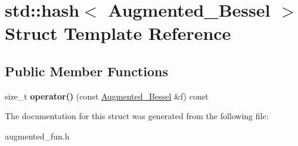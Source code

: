 \hypertarget{structstd_1_1hash_3_01Augmented__Bessel_01_4}{}\section{std\+:\+:hash$<$ Augmented\+\_\+\+Bessel $>$ Struct Template Reference}
\label{structstd_1_1hash_3_01Augmented__Bessel_01_4}
\subsection*{Public Member Functions}
\begin{DoxyCompactItemize}
\item 
\mbox{\label{structstd_1_1hash_3_01Augmented__Bessel_01_4_a81662182d4729c33627b6dbd13797962}} 
size\+\_\+t {\bfseries operator()} (const \hyperlink{classAugmented__Bessel}{Augmented\+\_\+\+Bessel} \&f) const
\end{DoxyCompactItemize}


The documentation for this struct was generated from the following file\+:\begin{DoxyCompactItemize}
\item 
augmented\+\_\+fun.\+h\end{DoxyCompactItemize}
